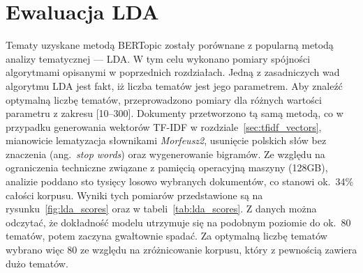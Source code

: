 \section{Ewaluacja LDA}
	Tematy uzyskane metodą BERTopic zostały porównane z popularną metodą analizy tematycznej --- LDA\@.
	W tym celu wykonano pomiary spójności algorytmami opisanymi w poprzednich rozdziałach.
	Jedną z zasadniczych wad algorytmu LDA jest fakt, iż liczba tematów jest jego parametrem.
	Aby znaleźć optymalną liczbę tematów, przeprowadzono pomiary dla różnych wartości parametru z zakresu [10--300].
	Dokumenty przetworzono tą samą metodą, co w przypadku generowania wektorów TF-IDF w rozdziale~\ref{sec:tfidf_vectors},
		mianowicie lematyzacja słownikami \emph{Morfeusz2}, usunięcie polskich słów bez znaczenia (ang.\ \emph{stop words}) oraz wygenerowanie bigramów.
	Ze względu na ograniczenia techniczne związane z pamięcią operacyjną maszyny (128GB), analizie poddano sto tysięcy losowo wybranych dokumentów,
		co stanowi ok.~34\% całości korpusu.
	Wyniki tych pomiarów przedstawione są na rysunku~\ref{fig:lda_scores} oraz w tabeli~\ref{tab:lda_scores}.
	Z danych można odczytać, że dokładność modelu utrzymuje się na podobnym poziomie do ok.~80 tematów, potem zaczyna gwałtownie spadać.
	Za optymalną liczbę tematów wybrano więc 80 ze względu na zróżnicowanie korpusu, który z pewnością zawiera dużo tematów.

